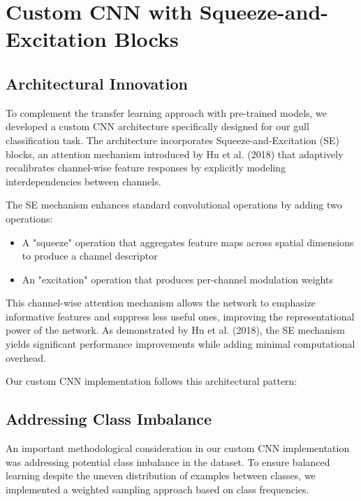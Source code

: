 



\section{Custom CNN with Squeeze-and-Excitation Blocks}

\subsection{Architectural Innovation}

To complement the transfer learning approach with pre-trained models, we developed a custom CNN architecture specifically designed for our gull classification task. The architecture incorporates Squeeze-and-Excitation (SE) blocks, an attention mechanism introduced by Hu et al. (2018) that adaptively recalibrates channel-wise feature responses by explicitly modeling interdependencies between channels.

The SE mechanism enhances standard convolutional operations by adding two operations:

\begin{itemize}
    \item A "squeeze" operation that aggregates feature maps across spatial dimensions to produce a channel descriptor
    \item An "excitation" operation that produces per-channel modulation weights
\end{itemize}

This channel-wise attention mechanism allows the network to emphasize informative features and suppress less useful ones, improving the representational power of the network. As demonstrated by Hu et al. (2018), the SE mechanism yields significant performance improvements while adding minimal computational overhead.

Our custom CNN implementation follows this architectural pattern:



\subsection{Addressing Class Imbalance}

An important methodological consideration in our custom CNN implementation was addressing potential class imbalance in the dataset. To ensure balanced learning despite the uneven distribution of examples between classes, we implemented a weighted sampling approach based on class frequencies.

